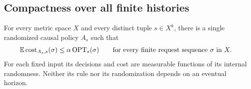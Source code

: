 \subsection{Compactness over all finite histories}

\begin{lemma}
\label{lem:compact-policy}
For every metric space $X$ and every distinct tuple $s\in X^k$, there
is a single randomized causal policy $A_s$ such that
\begin{equation}
 \mathbb E\operatorname{cost}_{A_s,s}(\sigma)\le\alpha\operatorname{OPT}_s(\sigma)
       \qquad\text{for every finite request sequence }\sigma\text{ in }X.
 \label{eq:all-inputs-distinct}
\end{equation}
For each fixed input its decisions and cost are measurable functions
of its internal randomness.  Neither its rule nor its randomization
depends on an eventual horizon.
\end{lemma}

